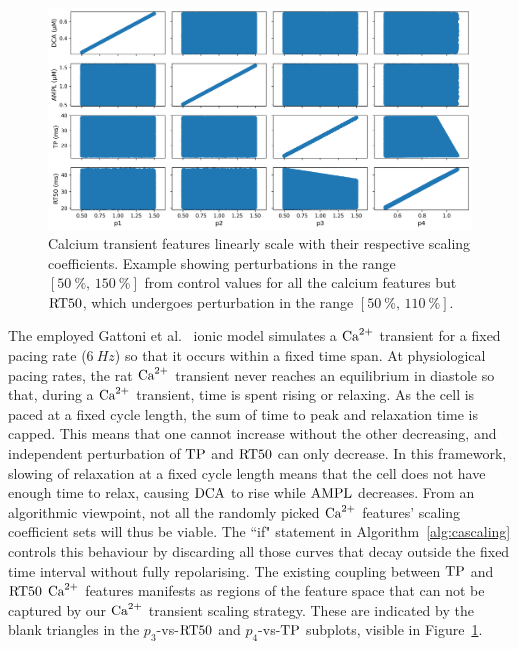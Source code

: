 \begin{figure}[ht!]
    \myfloatalign
    \includegraphics[width=\textwidth]{figures/chapter06/p_vs_b.png}
    \caption{Calcium transient features linearly scale with their respective scaling coefficients. Example showing perturbations in the range $[\SI{50}{\percent},\,\SI{150}{\percent}]$ from control values for all the calcium features but $\textrm{RT50}$, which undergoes perturbation in the range $[\SI{50}{\percent},\,\SI{110}{\percent}]$.}
    \label{fig:scalersvscafeatures}
\end{figure}

\vspace{0.2cm}
The employed Gattoni et al.~\cite{Gattoni:2017} ionic model simulates a $\textrm{Ca}^{2+}$ transient for a fixed pacing rate ($\SI{6}{Hz}$) so that it occurs within a fixed time span. At physiological pacing rates, the rat $\textrm{Ca}^{2+}$ transient never reaches an equilibrium in diastole so that, during a $\textrm{Ca}^{2+}$ transient, time is spent rising or relaxing. As the cell is paced at a fixed cycle length, the sum of time to peak and relaxation time is capped. This means that one cannot increase without the other decreasing, and independent perturbation of $\textrm{TP}$ and $\textrm{RT50}$ can only decrease. In this framework, slowing of relaxation at a fixed cycle length means that the cell does not have enough time to relax, causing $\textrm{DCA}$ to rise while $\textrm{AMPL}$ decreases. From an algorithmic viewpoint, not all the randomly picked $\textrm{Ca}^{2+}$ features' scaling coefficient sets will thus be viable. The ``if" statement in Algorithm~\ref{alg:cascaling} controls this behaviour by discarding all those curves that decay outside the fixed time interval without fully repolarising. The existing coupling between $\textrm{TP}$ and $\textrm{RT50}$ $\textrm{Ca}^{2+}$ features manifests as regions of the feature space that can not be captured by our $\textrm{Ca}^{2+}$ transient scaling strategy. These are indicated by the blank triangles in the $p_3$-vs-$\textrm{RT50}$ and $p_4$-vs-$\textrm{TP}$ subplots, visible in Figure~\ref{fig:scalersvscafeatures}.


